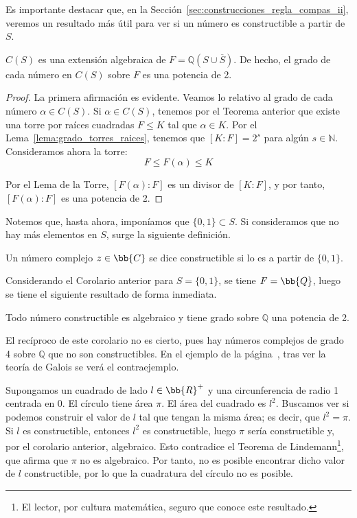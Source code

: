 Es importante destacar que, en la Sección~\ref{sec:construcciones_regla_compas_ii}, veremos un resultado más útil para ver si un número es constructible a partir de $S$.

\begin{coro}
    $C(S)$ es una extensión algebraica de $F=\mathbb{Q}(S\cup \overline{S})$. De hecho, el grado de cada número en $C(S)$ sobre $F$ es una potencia de 2. 
    \begin{proof}
        La primera afirmación es evidente. Veamos lo relativo al grado de cada número $\alpha \in C(S)$.
        Si $\alpha \in C(S)$, tenemos por el Teorema anterior que existe una torre por raíces cuadradas $F\leq K$ tal que $\alpha \in K$. Por el Lema~\ref{lema:grado_torres_raices}, tenemos que $[K:F] = 2^s$ para algún $s\in \mathbb{N}$. Consideramos ahora la torre:
        \begin{equation*}
            F \leq F(\alpha) \leq K
        \end{equation*}

        Por el Lema de la Torre, $[F(\alpha):F]$ es un divisor de $[K:F]$, y por tanto, $[F(\alpha):F]$ es una potencia de 2.
    \end{proof}
\end{coro}

Notemos que, hasta ahora, imponíamos que $\{0,1\}\subset S$. Si consideramos que no hay más elementos en $S$, surge la siguiente definición.
\begin{definicion}
    Un número complejo $z\in \bb{C}$ se dice constructible si lo es a partir de $\{0,1\}$.
\end{definicion}

Considerando el Corolario anterior para $S=\{0,1\}$, se tiene $F=\bb{Q}$, luego se tiene el siguiente resultado de forma inmediata.
\begin{coro}
    Todo número constructible es algebraico y tiene grado sobre $\mathbb{Q}$ una potencia de 2.
\end{coro}

El recíproco de este corolario no es cierto, pues hay números complejos de grado 4 sobre $\mathbb{Q}$ que no son constructibles. En el ejemplo de la página~\pageref{ejemplo:no_constructible}, tras ver la teoría de Galois se verá el contraejemplo.

\begin{ejemplo}
    Supongamos un cuadrado de lado $l\in \bb{R}^+$ y una circunferencia de radio 1 centrada en 0. El círculo tiene área $\pi$. El área del cuadrado es $l^2$. Buscamos ver si podemos construir el valor de $l$ tal que tengan la misma área; es decir, que $l^2=\pi$.\\
    
    Si $l$ es constructible, entonces $l^2$ es constructible, luego $\pi$ sería constructible y, por el corolario anterior, algebraico. Esto contradice el Teorema de Lindemann\footnote{El lector, por cultura matemática, seguro que conoce este resultado.}, que afirma que $\pi$ no es algebraico. Por tanto, no es posible encontrar dicho valor de $l$ constructible, por lo que la cuadratura del círculo no es posible.
\end{ejemplo}


